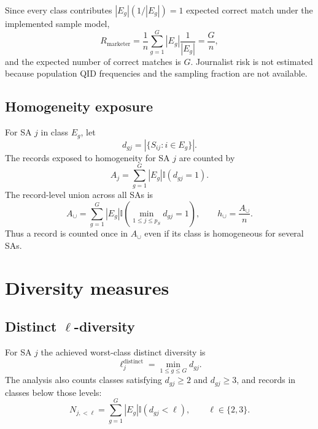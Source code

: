 \documentclass[11pt,a4paper]{article}
\newcommand{\I}{\mathbb{I}}
\newcommand{\card}[1]{\left\lvert #1\right\rvert}
\begin{document}
Since every class contributes
$\card{E_g}(1/\card{E_g})=1$ expected correct match under the implemented
sample model,
\begin{equation}
R_{\mathrm{marketer}}
=\frac1n\sum_{g=1}^{G}\card{E_g}\frac1{\card{E_g}}
=\frac Gn,
\tag{56}
\end{equation}
and the expected number of correct matches is $G$.  Journalist risk is not
estimated because population QID frequencies and the sampling fraction are not
available.

\subsection{Homogeneity exposure}

For SA $j$ in class $E_g$, let
\begin{equation}
d_{gj}=\card{\{S_{ij}:i\in E_g\}}.
\tag{57}
\end{equation}
The records exposed to homogeneity for SA $j$ are counted by
\begin{equation}
A_j=\sum_{g=1}^{G}\card{E_g}\I(d_{gj}=1).
\tag{58}
\end{equation}
The record-level union across all SAs is
\begin{equation}
A_{\cup}=\sum_{g=1}^{G}\card{E_g}
\I\!\left(\min_{1\le j\le p_S}d_{gj}=1\right),
\qquad
h_{\cup}=\frac{A_{\cup}}n.
\tag{59}
\end{equation}
Thus a record is counted once in $A_{\cup}$ even if its class is homogeneous
for several SAs.

\section{Diversity measures}

\subsection{Distinct \texorpdfstring{$\ell$}{l}-diversity}

For SA $j$ the achieved worst-class distinct diversity is
\begin{equation}
\ell^{\mathrm{distinct}}_j=\min_{1\le g\le G}d_{gj}.
\tag{60}
\end{equation}
The analysis also counts classes satisfying $d_{gj}\ge2$ and $d_{gj}\ge3$,
and records in classes below those levels:
\begin{equation}
N_{j,<\ell}=\sum_{g=1}^{G}\card{E_g}\I(d_{gj}<\ell),
\qquad \ell\in\{2,3\}.
\tag{61}
\end{equation}
\end{document}
